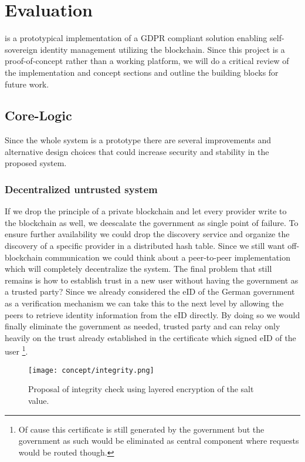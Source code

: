 \chapter{Evaluation}
\label{cha:evaluation}

\projectName{} is a prototypical implementation of a GDPR compliant solution enabling self-sovereign identity management
utilizing the blockchain. Since this project is a proof-of-concept rather than a working platform, we will do a critical
 review of the implementation and concept sections and outline the building blocks for future work.

\section{Core-Logic}
\label{sec:coreLogicEval}
Since the whole system is a prototype there are several improvements and alternative design choices that could increase
security and stability in the proposed system.

\subsection{Decentralized untrusted system}
\label{sec:untrustedSystem}
If we drop the principle of a private blockchain and let every provider write to the blockchain as well, we deescalate
the government as single point of failure.
To ensure further availability we could drop the discovery service and organize the discovery of a specific provider
in a distributed hash table. Since we still want off-blockchain communication we could think about a peer-to-peer
implementation which will completely decentralize the system. The final problem that still remains is how to establish
trust in a new user without having the government as a trusted party? Since we already considered the eID of the German
government as a verification mechanism we can take this to the next level by allowing the peers to retrieve identity
information from the eID directly. By doing so we would finally eliminate the government as needed, trusted party and
can relay only heavily on the trust already established in the certificate which signed eID of the user
\footnote{Of cause this certificate is still generated by the government but the government as such would be eliminated
as central component where requests would be routed though.}.

\begin{figure}
\texttt{[image: concept/integrity.png]}
\centering
\caption{Proposal of integrity check using layered encryption of the salt value.}
\label{fig:integrity}
\end{figure}

